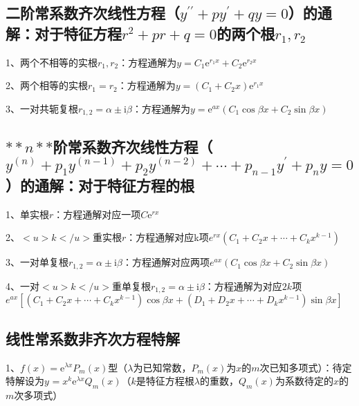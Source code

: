 \subsection{二阶常系数齐次线性方程（$ y^{\prime \prime}+p y^{\prime}+q y=0 $）的通解：对于特征方程$ r^{2}+p r+q=0 $的两个根$  r_{1}, r_{2}  $}

1、两个不相等的实根$ r_{1}, r_{2} $：方程通解为$  y=C_{1} \mathrm{e}^{r_1 x}+C_{2} \mathrm{e}^{r_2 x} $

2、两个相等的实根$ r_{1}=r_{2} $：方程通解为$ y=\left(C_{1}+C_{2} x\right) \mathrm{e}^{r_1 x} $

3、一对共轭复根$ r_{1,2}=\alpha \pm \mathrm{i} \beta $：方程通解为$ y=\mathrm{e}^{a x}\left(C_{1} \cos \beta x+C_{2} \sin \beta x\right) $



\subsection{$ **n** $阶常系数齐次线性方程（$ y^{(n)}+p_{1} y^{(n-1)}+p_{2} y^{(n-2)}+\cdots+p_{n-1} y^{\prime}+p_{n} y=0 $）的通解：对于特征方程的根}

1、单实根$ r $：方程通解对应一项$  C \mathrm{e}^{rx} $

2、$ <u>k</u> $重实根$ r $：方程通解对应k项$ {e}^{r x}\left(C_{1}+C_{2} x+\cdots+C_{k} x^{k-1}\right) $

3、一对单复根$ r_{1,2}=\alpha \pm \mathrm{i} \beta $：方程通解对应两项$ {e}^{a x}\left(C_{1} \cos \beta x+C_{2} \sin \beta x\right) $

4、一对$ <u>k</u> $重单复根$ r_{1,2}=\alpha \pm \mathrm{i} \beta $：方程通解为对应$ 2k $项$ {e}^{{ax}}[(C_{1}+C_{2} x+\cdots+C_{k} x^{k-1}) \cos \beta x+(D_{1}+D_{2} x+\cdots+D_{k} x^{k-1}) \sin \beta x] $



\subsection{线性常系数非齐次方程特解}

1、$ f(x)=\mathrm{e}^{\lambda x} P_{m}(x) $型（$ \lambda $为已知常数，$ P_{m}(x) $为$ x $的$ m $次已知多项式）：待定特解设为$ y^{}=x^{k} \mathrm{e}^{\lambda x} Q_{m}(x) $（$ k $是特征方程根$ \lambda $的重数，$ Q_{m}(x) $为系数待定的$ x $的$ m $次多项式）

